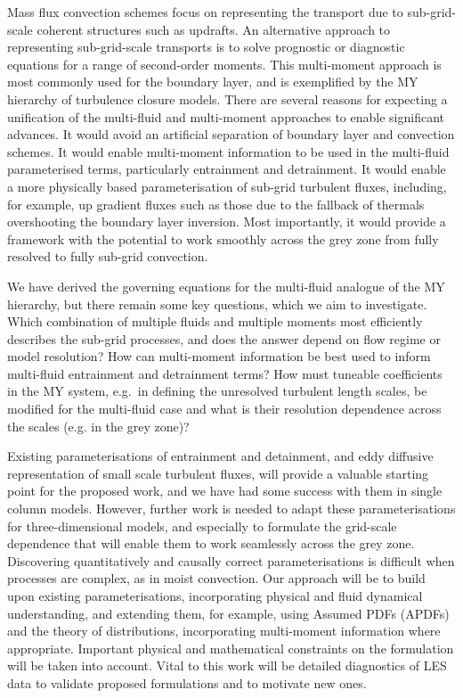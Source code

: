 \documentclass[11pt,a4paper]{article}
\begin{document}
Mass flux convection schemes focus on representing the transport due to sub-grid-scale coherent structures such as
updrafts. An alternative approach to representing sub-grid-scale transports is to solve prognostic or diagnostic
equations for a range of second-order moments. This multi-moment approach is most commonly used for the
boundary layer, and is exemplified by the \citet{mellor1973,mellor1974,mellor1982} MY hierarchy of turbulence
closure models.
There are several reasons for expecting a unification of the multi-fluid and multi-moment approaches to enable
significant advances. It would avoid an artificial separation of boundary layer and convection schemes.
It would enable multi-moment information to be used in the multi-fluid parameterised terms, particularly
entrainment and detrainment. It would enable a more physically based parameterisation of sub-grid turbulent
fluxes, including, for example, up gradient fluxes such as those due to the fallback of thermals
overshooting the boundary layer inversion. Most importantly, it would provide a framework
with the potential to work smoothly across the grey zone from fully resolved to fully sub-grid convection.

We have derived the governing equations for the multi-fluid analogue of the MY hierarchy, but there remain
some key questions, which we aim to investigate. Which combination of multiple fluids and multiple moments
most efficiently describes the sub-grid processes, and does the answer depend on flow regime or model resolution?
How can multi-moment information be best used to inform multi-fluid entrainment and detrainment terms?
How must tuneable coefficients in the MY system, e.g.\ in defining  the unresolved turbulent length scales, be modified
for the multi-fluid case and what is their resolution dependence across the scales (e.g. in the grey zone)?

Existing parameterisations of entrainment and detainment, and eddy diffusive representation of small scale turbulent
fluxes, will provide a valuable starting point for the proposed work, and we have had some success with them in
single column models. However, further work is needed to adapt these parameterisations for three-dimensional models,
and especially to formulate the grid-scale dependence that will enable them to work seamlessly across the grey zone.
Discovering quantitatively and causally correct parameterisations is difficult when processes are complex, as in moist
convection. Our approach will be to build upon existing parameterisations, incorporating physical and fluid dynamical
understanding, and extending them, for example, using Assumed PDFs (APDFs) and the theory of distributions, incorporating
multi-moment information where appropriate. Important physical and mathematical constraints on the formulation will
be taken into account. Vital to this work will be detailed diagnostics of LES data to validate proposed formulations
and to motivate new ones.
\end{document}
